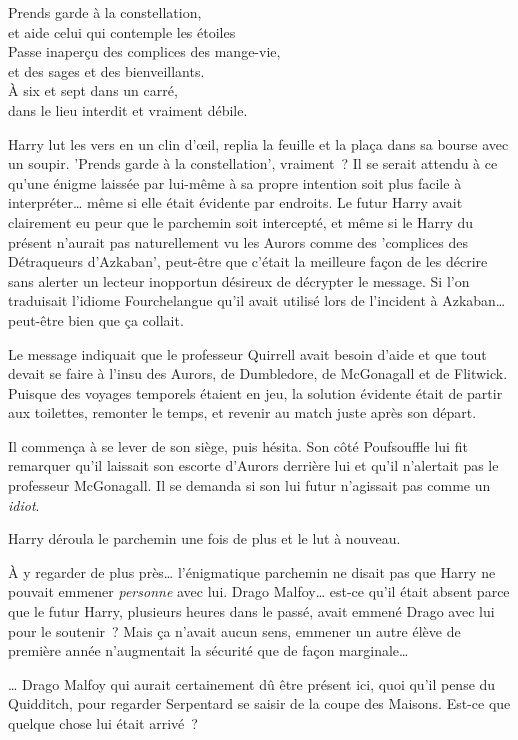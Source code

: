 \begin{writtenNote}
Prends garde à la constellation,\\
et aide celui qui contemple les étoiles
\\
Passe inaperçu des complices des mange-vie,\\
et des sages et des bienveillants.
\\
À six et sept dans un carré,\\
dans le lieu interdit et vraiment débile.
\end{writtenNote}

Harry lut les vers en un clin d'œil, replia la feuille et la plaça dans sa bourse avec un soupir. 'Prends garde à la constellation', vraiment~? Il se serait attendu à ce qu'une énigme laissée par lui-même à sa propre intention soit plus facile à interpréter… même si elle était évidente par endroits. Le futur Harry avait clairement eu peur que le parchemin soit intercepté, et même si le Harry du présent n'aurait pas naturellement vu les Aurors comme des 'complices des Détraqueurs d'Azkaban', peut-être que c'était la meilleure façon de les décrire sans alerter un lecteur inopportun désireux de décrypter le message. Si l'on traduisait l'idiome Fourchelangue qu'il avait utilisé lors de l'incident à Azkaban… peut-être bien que ça collait.

Le message indiquait que le professeur Quirrell avait besoin d'aide et que tout devait se faire à l'insu des Aurors, de Dumbledore, de McGonagall et de Flitwick. Puisque des voyages temporels étaient en jeu, la solution évidente était de partir aux toilettes, remonter le temps, et revenir au match juste après son départ.

Il commença à se lever de son siège, puis hésita. Son côté Poufsouffle lui fit remarquer qu'il laissait son escorte d'Aurors derrière lui et qu'il n'alertait pas le professeur McGonagall. Il se demanda si son lui futur n'agissait pas comme un \emph{idiot}.

Harry déroula le parchemin une fois de plus et le lut à nouveau.

À y regarder de plus près… l'énigmatique parchemin ne disait pas que Harry ne pouvait emmener \emph{personne} avec lui. Drago Malfoy… est-ce qu'il était absent parce que le futur Harry, plusieurs heures dans le passé, avait emmené Drago avec lui pour le soutenir~? Mais ça n'avait aucun sens, emmener un autre élève de première année n'augmentait la sécurité que de façon marginale…

… Drago Malfoy qui aurait certainement dû être présent ici, quoi qu'il pense du Quidditch, pour regarder Serpentard se saisir de la coupe des Maisons. Est-ce que quelque chose lui était arrivé~?

